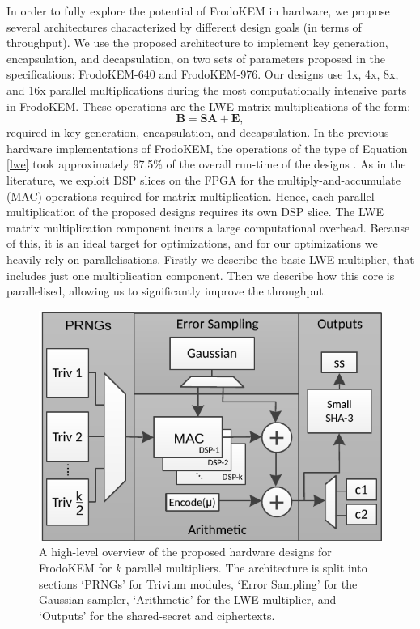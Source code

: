 In order to fully explore the potential of FrodoKEM in hardware, we propose several architectures characterized by different design goals (in terms of throughput). We use the proposed architecture to implement key generation, encapsulation, and decapsulation, on two sets of parameters proposed in the specifications: FrodoKEM-640 and FrodoKEM-976. Our designs use 1x, 4x, 8x, and 16x parallel multiplications during the most computationally intensive parts in FrodoKEM. These operations are the LWE matrix multiplications of the form:
\begin{equation}
\mathbf{B} = \mathbf{S} \mathbf{A} + \mathbf{E}, \label{lwe}
\end{equation}
 required in key generation, encapsulation, and decapsulation. In the previous hardware implementations of FrodoKEM, the operations of the type of Equation \ref{lwe} took approximately 97.5\% of the overall run-time of the designs \cite{howe2018standard}. As in the literature, we exploit DSP slices on the FPGA for the multiply-and-accumulate (MAC) operations required for matrix multiplication. Hence, each parallel multiplication of the proposed designs requires its own DSP slice. The LWE matrix multiplication component incurs a large computational overhead. Because of this, it is an ideal target for optimizations, and for our optimizations we heavily rely on parallelisations. Firstly we describe the basic LWE multiplier, that includes just one multiplication component. Then we describe how this core is parallelised, allowing us to significantly improve the throughput.
 
\begin{figure}[htbp]\centering
\includegraphics[scale=0.75]{figures/arch_new.pdf}
\caption{A high-level overview of the proposed hardware designs for FrodoKEM for $k$ parallel multipliers. The architecture is split into sections `PRNGs' for Trivium modules, `Error Sampling' for the Gaussian sampler, `Arithmetic' for the LWE multiplier, and `Outputs' for the shared-secret and ciphertexts.}\label{arch}
\end{figure}

